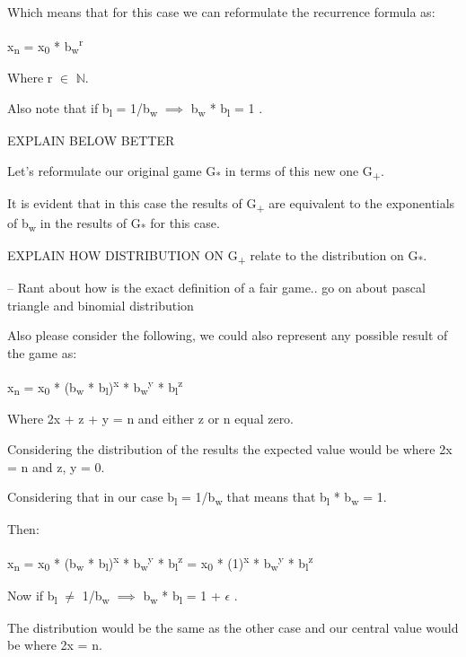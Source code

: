 \documentclass[12pt,reqno]{amsart}
\begin{document}
Which means that for this case we can reformulate the recurrence formula as:

x\textsubscript{n} = x\textsubscript{0} * b\textsubscript{w}\textsuperscript{r}

Where r $\in$ $\mathbb{N}$.  

Also note that if b\textsubscript{l} = 1/b\textsubscript{w} $\implies$ b\textsubscript{w} * b\textsubscript{l} = 1 .

EXPLAIN BELOW BETTER

Let's reformulate our original game G\textsubscript{*} in terms of this new one G\textsubscript{+}.

It is evident that in this case the results of G\textsubscript{+} are equivalent to the exponentials of b\textsubscript{w} in the results of G\textsubscript{*} for this case.

EXPLAIN HOW DISTRIBUTION ON G\textsubscript{+} relate to the distribution on G\textsubscript{*}.

-- Rant about how is the exact definition of a fair game.. go on about pascal triangle and binomial distribution

Also please consider the following, we could also represent any possible result of the game as:

x\textsubscript{n} = x\textsubscript{0} * (b\textsubscript{w} * b\textsubscript{l})\textsuperscript{x} * b\textsubscript{w}\textsuperscript{y} * b\textsubscript{l}\textsuperscript{z}

Where 2x + z + y = n and either z or n equal zero.

Considering the distribution of the results the expected value would be where 2x = n and z, y = 0.

Considering that in our case b\textsubscript{l} = 1/b\textsubscript{w} that means that b\textsubscript{l} * b\textsubscript{w} = 1.

Then:

x\textsubscript{n} = x\textsubscript{0} * (b\textsubscript{w} * b\textsubscript{l})\textsuperscript{x} * b\textsubscript{w}\textsuperscript{y} * b\textsubscript{l}\textsuperscript{z} = x\textsubscript{0} * (1)\textsuperscript{x} * b\textsubscript{w}\textsuperscript{y} * b\textsubscript{l}\textsuperscript{z}


Now if b\textsubscript{l} $\neq$ 1/b\textsubscript{w}  $\implies$  b\textsubscript{w} * b\textsubscript{l} = 1 + $\epsilon$ .

The distribution would be the same as the other case and our central value would be where 2x = n.
\end{document}
